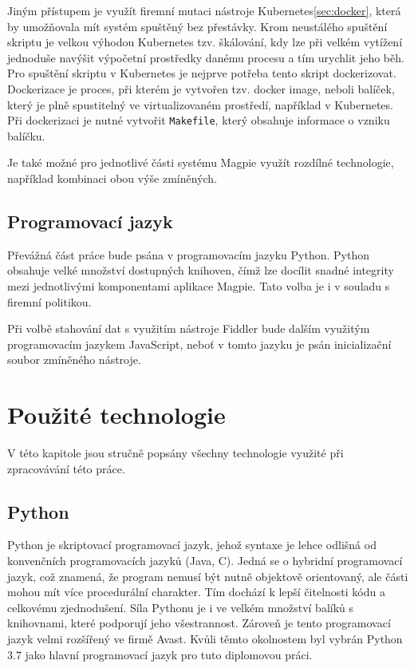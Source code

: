 \documentclass[thesis=M,czech,hidelinks]{FITthesis}[2013/05/06]
\begin{document}
Jiným přístupem je využít firemní mutaci nástroje Kubernetes\ref{sec:docker}, která by umožňovala mít systém spuštěný bez přestávky. Krom neustálého spuštění skriptu je velkou výhodou Kubernetes tzv. škálování, kdy lze při velkém vytížení jednoduše navýšit výpočetní prostředky danému procesu a tím urychlit jeho běh. Pro spuštění skriptu v Kubernetes je nejprve potřeba tento skript dockerizovat. Dockerizace je proces, při kterém je vytvořen tzv. docker image, neboli balíček, který je plně spustitelný ve virtualizovaném prostředí, například v Kubernetes. Při dockerizaci je nutné vytvořit \texttt{Makefile}, který obsahuje informace o vzniku balíčku. 

Je také možné pro jednotlivé části systému Magpie využít rozdílné technologie, například kombinaci obou výše zmíněných.

\section{Programovací jazyk}
Převážná část práce bude psána v programovacím jazyku Python\cite{python}. Python obsahuje velké množství dostupných knihoven, čímž lze docílit snadné integrity mezi jednotlivými komponentami aplikace Magpie. Tato volba je i v souladu s firemní politikou. 

Při volbě stahování dat s využitím nástroje Fiddler bude dalším využitým programovacím jazykem JavaScript, neboť v tomto jazyku je psán inicializační soubor zmíněného nástroje.
















\chapter{Použité technologie}
V této kapitole jsou stručně popsány všechny technologie využité při zpracovávání této práce.

\section{Python}\label{sec:python}
Python je skriptovací programovací jazyk, jehož syntaxe je lehce odlišná od konvenčních programovacích jazyků (Java, C). Jedná se o hybridní programovací jazyk, což znamená, že program nemusí být nutně objektově orientovaný, ale části mohou mít více procedurální charakter. Tím dochází k lepší čitelnosti kódu a celkovému zjednodušení. Síla Pythonu je i ve velkém množství balíků s knihovnami, které podporují jeho všestrannost. Zároveň je tento programovací jazyk velmi rozšířený ve firmě Avast. Kvůli těmto okolnostem byl vybrán Python 3.7 jako hlavní programovací jazyk pro tuto diplomovou práci.
\end{document}
